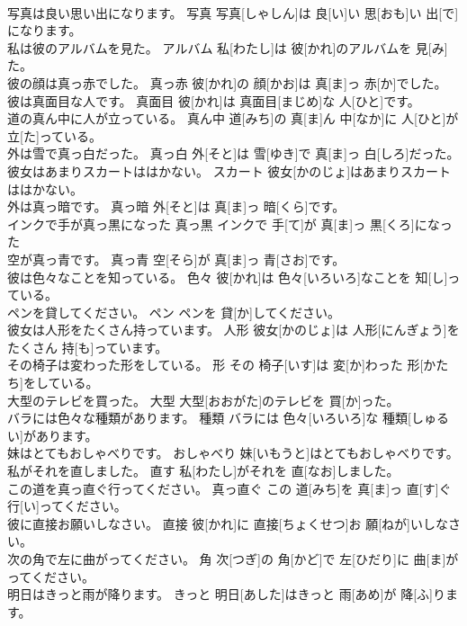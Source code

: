 \documentclass[8pt]{extreport}
\begin{document}
\begin{CJK}{UTF8}{min}
\\	写真は良い思い出になります。	写真	写真[しゃしん]は 良[い]い 思[おも]い 出[で]になります。	
\\	私は彼のアルバムを見た。	アルバム	私[わたし]は 彼[かれ]のアルバムを 見[み]た。	
\\	彼の顔は真っ赤でした。	真っ赤	彼[かれ]の 顔[かお]は 真[ま]っ 赤[か]でした。	
\\	彼は真面目な人です。	真面目	彼[かれ]は 真面目[まじめ]な 人[ひと]です。	
\\	道の真ん中に人が立っている。	真ん中	道[みち]の 真[ま]ん 中[なか]に 人[ひと]が 立[た]っている。	
\\	外は雪で真っ白だった。	真っ白	外[そと]は 雪[ゆき]で 真[ま]っ 白[しろ]だった。	
\\	彼女はあまりスカートははかない。	スカート	彼女[かのじょ]はあまりスカートははかない。	
\\	外は真っ暗です。	真っ暗	外[そと]は 真[ま]っ 暗[くら]です。	
\\	インクで手が真っ黒になった	真っ黒	インクで 手[て]が 真[ま]っ 黒[くろ]になった	
\\	空が真っ青です。	真っ青	空[そら]が 真[ま]っ 青[さお]です。	
\\	彼は色々なことを知っている。	色々	彼[かれ]は 色々[いろいろ]なことを 知[し]っている。	
\\	ペンを貸してください。	ペン	ペンを 貸[か]してください。	
\\	彼女は人形をたくさん持っています。	人形	彼女[かのじょ]は 人形[にんぎょう]をたくさん 持[も]っています。	
\\	その椅子は変わった形をしている。	形	その 椅子[いす]は 変[か]わった 形[かたち]をしている。	
\\	大型のテレビを買った。	大型	大型[おおがた]のテレビを 買[か]った。	
\\	バラには色々な種類があります。	種類	バラには 色々[いろいろ]な 種類[しゅるい]があります。	
\\	妹はとてもおしゃべりです。	おしゃべり	妹[いもうと]はとてもおしゃべりです。	
\\	私がそれを直しました。	直す	私[わたし]がそれを 直[なお]しました。	
\\	この道を真っ直ぐ行ってください。	真っ直ぐ	この 道[みち]を 真[ま]っ 直[す]ぐ 行[い]ってください。	
\\	彼に直接お願いしなさい。	直接	彼[かれ]に 直接[ちょくせつ]お 願[ねが]いしなさい。	
\\	次の角で左に曲がってください。	角	次[つぎ]の 角[かど]で 左[ひだり]に 曲[ま]がってください。	
\\	明日はきっと雨が降ります。	きっと	明日[あした]はきっと 雨[あめ]が 降[ふ]ります。	

\end{CJK}
\end{document}
